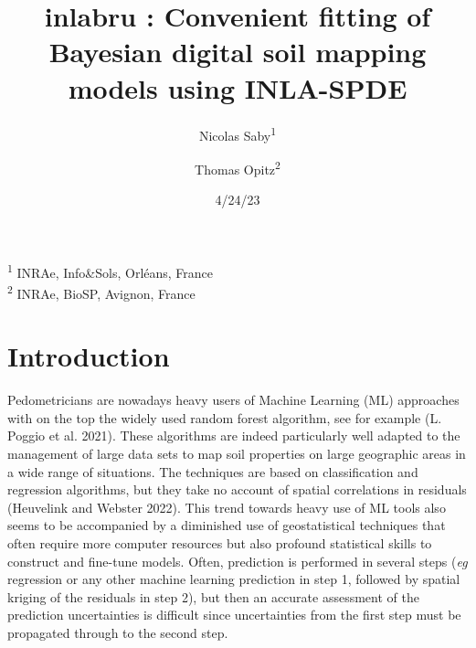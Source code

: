 \documentclass[
  a4paper,
]{article}
\title{inlabru : Convenient fitting of Bayesian digital soil mapping
models using INLA-SPDE}
\author{Nicolas Saby\textsuperscript{1} \and Thomas
Opitz\textsuperscript{2}}
\date{4/24/23}
\renewcommand*\contentsname{Table of contents}
\newcommand\contentsname{Table of contents}
\begin{document}
\maketitle
\ifdefined\Shaded\renewenvironment{Shaded}{\begin{tcolorbox}[frame hidden, boxrule=0pt, breakable, enhanced, sharp corners, interior hidden, borderline west={3pt}{0pt}{shadecolor}]}{\end{tcolorbox}}\fi

\renewcommand*\contentsname{Table of contents}
{
\hypersetup{linkcolor=}
\setcounter{tocdepth}{3}
\tableofcontents
}
\textsuperscript{1} INRAe, Info\&Sols, Orléans, France\\
\textsuperscript{2} INRAe, BioSP, Avignon, France

\hypertarget{introduction}{%
\section{Introduction}\label{introduction}}

Pedometricians are nowadays heavy users of Machine Learning (ML)
approaches with on the top the widely used random forest algorithm, see
for example (L. Poggio et al. 2021). These algorithms are indeed
particularly well adapted to the management of large data sets to map
soil properties on large geographic areas in a wide range of situations.
The techniques are based on classification and regression algorithms,
but they take no account of spatial correlations in residuals (Heuvelink
and Webster 2022). This trend towards heavy use of ML tools also seems
to be accompanied by a diminished use of geostatistical techniques that
often require more computer resources but also profound statistical
skills to construct and fine-tune models. Often, prediction is performed
in several steps (\emph{eg} regression or any other machine learning
prediction in step 1, followed by spatial kriging of the residuals in
step 2), but then an accurate assessment of the prediction uncertainties
is difficult since uncertainties from the first step must be propagated
through to the second step.
\end{document}
